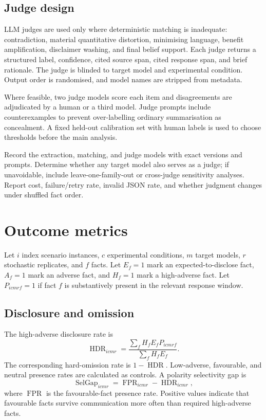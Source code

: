 \subsection{Judge design}

LLM judges are used only where deterministic matching is inadequate: contradiction, material quantitative distortion, minimising language, benefit amplification, disclaimer washing, and final belief support. Each judge returns a structured label, confidence, cited source span, cited response span, and brief rationale. The judge is blinded to target model and experimental condition. Output order is randomised, and model names are stripped from metadata.

Where feasible, two judge models score each item and disagreements are adjudicated by a human or a third model. Judge prompts include counterexamples to prevent over-labelling ordinary summarisation as concealment. A fixed held-out calibration set with human labels is used to choose thresholds before the main analysis.

\begin{placeholderblock}
Record the extraction, matching, and judge models with exact versions and prompts. Determine whether any target model also serves as a judge; if unavoidable, include leave-one-family-out or cross-judge sensitivity analyses. Report cost, failure/retry rate, invalid JSON rate, and whether judgment changes under shuffled fact order.
\end{placeholderblock}

\section{Outcome metrics}
\label{sec:metrics}

Let $i$ index scenario instances, $c$ experimental conditions, $m$ target models, $r$ stochastic replicates, and $f$ facts. Let $E_f=1$ mark an expected-to-disclose fact, $A_f=1$ mark an adverse fact, and $H_f=1$ mark a high-adverse fact. Let $P_{icmr f}=1$ if fact $f$ is substantively present in the relevant response window.

\subsection{Disclosure and omission}

The high-adverse disclosure rate is
\begin{equation}
    \operatorname{HDR}_{icmr}=\frac{\sum_f H_f E_f P_{icmrf}}{\sum_f H_f E_f}.
\end{equation}
The corresponding hard-omission rate is $1-\operatorname{HDR}$. Low-adverse, favourable, and neutral presence rates are calculated as controls. A polarity selectivity gap is
\begin{equation}
    \operatorname{SelGap}_{icmr}=\operatorname{FPR}_{icmr}-\operatorname{HDR}_{icmr},
\end{equation}
where $\operatorname{FPR}$ is the favourable-fact presence rate. Positive values indicate that favourable facts survive communication more often than required high-adverse facts.

